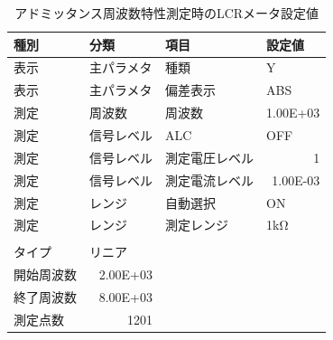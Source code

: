 \documentclass[dvipdfmx,titlepage,a4j]{jsarticle}  %
\numberwithin{equation}{section}
\begin{document}
\begin{table}[H]
  \caption{アドミッタンス周波数特性測定時のLCRメータ設定値}
  \begin{center}
    \begin{tabular}{l|l|l|l}
      \hline
      種別           & 分類                          & 項目           & 設定値                       \\ \hline\hline
      表示           & 主パラメタ                    & 種類           & Y                            \\ \hline
      表示           & 主パラメタ                    & 偏差表示       & ABS                          \\ \hline
      測定           & 周波数                        & 周波数         & \multicolumn{1}{r}{1.00E+03} \\ \hline
      測定           & 信号レベル                    & ALC            & OFF                          \\ \hline
      測定           & 信号レベル                    & 測定電圧レベル & \multicolumn{1}{r}{1}        \\ \hline
      測定           & 信号レベル                    & 測定電流レベル & \multicolumn{1}{r}{1.00E-03} \\ \hline
      測定           & レンジ                        & 自動選択       & ON                           \\ \hline
      測定           & レンジ                        & 測定レンジ     & 1kΩ                          \\ \hline
      [スイープ測定] &                               &                &                              \\ \hline
      タイプ         & リニア                        &                &                              \\ \hline
      開始周波数     & \multicolumn{1}{r|}{2.00E+03} &                &                              \\ \hline
      終了周波数     & \multicolumn{1}{r|}{8.00E+03} &                &                              \\ \hline
      測定点数       & \multicolumn{1}{r|}{1201}     &                &                              \\ \hline
    \end{tabular}
  \end{center}
  \label{tbl:lcrm-admitance}
\end{table}
\end{document}
